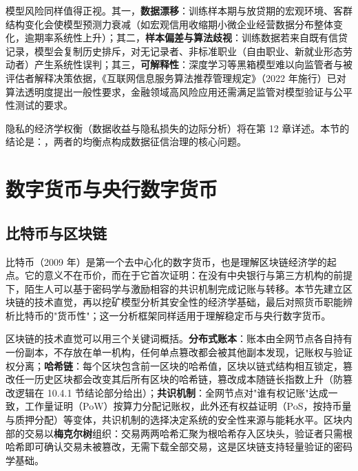 模型风险同样值得正视。其一，\textbf{数据漂移}：训练样本期与放贷期的宏观环境、客群结构变化会使模型预测力衰减（如宏观信用收缩期小微企业经营数据分布整体变化，逾期率系统性上升）；其二，\textbf{样本偏差与算法歧视}：训练数据若来自既有信贷记录，模型会复制历史排斥，对无记录者、非标准职业（自由职业、新就业形态劳动者）产生系统性误判；其三，\textbf{可解释性}：深度学习等黑箱模型难以向监管者与被评估者解释决策依据，《互联网信息服务算法推荐管理规定》（2022 年施行）已对算法透明度提出一般性要求，金融领域高风险应用还需满足监管对模型验证与公平性测试的要求。

隐私的经济学权衡（数据收益与隐私损失的边际分析）将在第 12 章详述。本节的结论是：，两者的均衡点构成数据征信治理的核心问题。

\section{数字货币与央行数字货币}

\subsection{比特币与区块链}

比特币（2009 年）是第一个去中心化的数字货币，也是理解区块链经济学的起点。它的意义不在币价，而在于它首次证明：在没有中央银行与第三方机构的前提下，陌生人可以基于密码学与激励相容的共识机制完成记账与转移。本节先建立区块链的技术直觉，再以挖矿模型分析其安全性的经济学基础，最后对照货币职能辨析比特币的"货币性"；这一分析框架同样适用于理解稳定币与央行数字货币。

区块链的技术直觉可以用三个关键词概括。\textbf{分布式账本}：账本由全网节点各自持有一份副本，不存放在单一机构，任何单点篡改都会被其他副本发现，记账权与验证权分离；\textbf{哈希链}：每个区块包含前一区块的哈希值，区块以链式结构相互锁定，篡改任一历史区块都会改变其后所有区块的哈希链，篡改成本随链长指数上升（防篡改逻辑在 10.4.1 节结论部分给出）；\textbf{共识机制}：全网节点对"谁有权记账"达成一致，工作量证明（PoW）按算力分配记账权，此外还有权益证明（PoS，按持币量与质押分配）等变体，共识机制的选择决定系统的安全性来源与能耗水平。区块内部的交易以\textbf{梅克尔树}组织：交易两两哈希汇聚为根哈希存入区块头，验证者只需根哈希即可确认交易未被篡改，无需下载全部交易，这是区块链支持轻量验证的密码学基础。

